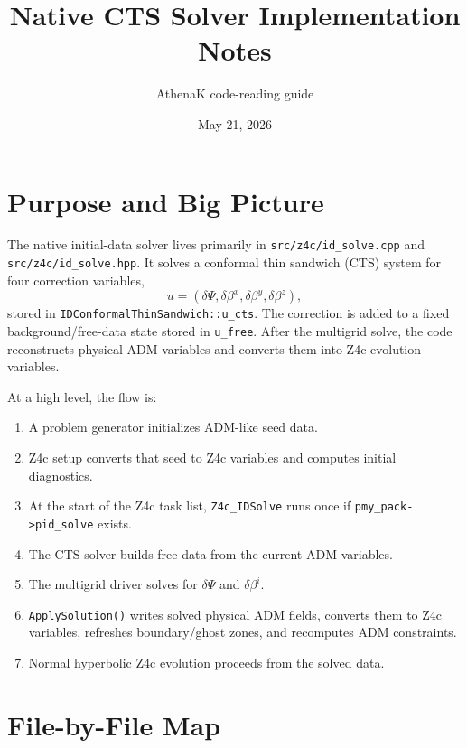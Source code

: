 \documentclass[11pt]{article}
\title{Native CTS Solver Implementation Notes}
\author{AthenaK code-reading guide}
\date{May 21, 2026}
\newcommand{\file}[1]{\nolinkurl{#1}}
\newcommand{\code}[1]{\texttt{#1}}
\begin{document}
\maketitle

\section{Purpose and Big Picture}

The native initial-data solver lives primarily in \file{src/z4c/id_solve.cpp} and
\file{src/z4c/id_solve.hpp}.  It solves a conformal thin sandwich (CTS) system for
four correction variables,
\[
  u = (\delta\Psi,\delta\beta^x,\delta\beta^y,\delta\beta^z),
\]
stored in \code{IDConformalThinSandwich::u\_cts}.  The correction is added to a
fixed background/free-data state stored in \code{u\_free}.  After the multigrid
solve, the code reconstructs physical ADM variables and converts them into Z4c
evolution variables.

At a high level, the flow is:
\begin{enumerate}
  \item A problem generator initializes ADM-like seed data.
  \item Z4c setup converts that seed to Z4c variables and computes initial
        diagnostics.
  \item At the start of the Z4c task list, \code{Z4c\_IDSolve} runs once
        if \code{pmy\_pack->pid\_solve} exists.
  \item The CTS solver builds free data from the current ADM variables.
  \item The multigrid driver solves for \(\delta\Psi\) and \(\delta\beta^i\).
  \item \code{ApplySolution()} writes solved physical ADM fields, converts them
        to Z4c variables, refreshes boundary/ghost zones, and recomputes ADM
        constraints.
  \item Normal hyperbolic Z4c evolution proceeds from the solved data.
\end{enumerate}

\section{File-by-File Map}
\end{document}
